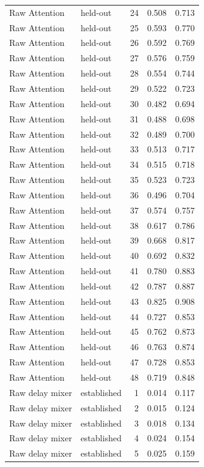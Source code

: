 \begin{tabular}{llrrr}
Raw Attention & held-out & 24 & 0.508 & 0.713 \\
Raw Attention & held-out & 25 & 0.593 & 0.770 \\
Raw Attention & held-out & 26 & 0.592 & 0.769 \\
Raw Attention & held-out & 27 & 0.576 & 0.759 \\
Raw Attention & held-out & 28 & 0.554 & 0.744 \\
Raw Attention & held-out & 29 & 0.522 & 0.723 \\
Raw Attention & held-out & 30 & 0.482 & 0.694 \\
Raw Attention & held-out & 31 & 0.488 & 0.698 \\
Raw Attention & held-out & 32 & 0.489 & 0.700 \\
Raw Attention & held-out & 33 & 0.513 & 0.717 \\
Raw Attention & held-out & 34 & 0.515 & 0.718 \\
Raw Attention & held-out & 35 & 0.523 & 0.723 \\
Raw Attention & held-out & 36 & 0.496 & 0.704 \\
Raw Attention & held-out & 37 & 0.574 & 0.757 \\
Raw Attention & held-out & 38 & 0.617 & 0.786 \\
Raw Attention & held-out & 39 & 0.668 & 0.817 \\
Raw Attention & held-out & 40 & 0.692 & 0.832 \\
Raw Attention & held-out & 41 & 0.780 & 0.883 \\
Raw Attention & held-out & 42 & 0.787 & 0.887 \\
Raw Attention & held-out & 43 & 0.825 & 0.908 \\
Raw Attention & held-out & 44 & 0.727 & 0.853 \\
Raw Attention & held-out & 45 & 0.762 & 0.873 \\
Raw Attention & held-out & 46 & 0.763 & 0.874 \\
Raw Attention & held-out & 47 & 0.728 & 0.853 \\
Raw Attention & held-out & 48 & 0.719 & 0.848 \\
Raw delay mixer & established & 1 & 0.014 & 0.117 \\
Raw delay mixer & established & 2 & 0.015 & 0.124 \\
Raw delay mixer & established & 3 & 0.018 & 0.134 \\
Raw delay mixer & established & 4 & 0.024 & 0.154 \\
Raw delay mixer & established & 5 & 0.025 & 0.159 \\

\end{tabular}
